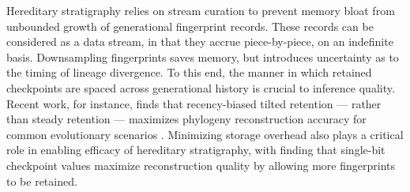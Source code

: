 Hereditary stratigraphy relies on stream curation to prevent memory bloat from unbounded growth of generational fingerprint records.
These records can be considered as a data stream, in that they accrue piece-by-piece, on an indefinite basis.
Downsampling fingerprints saves memory, but introduces uncertainty as to the timing of lineage divergence.
To this end, the manner in which retained checkpoints are spaced across generational history is crucial to inference quality.
Recent work, for instance, finds that recency-biased tilted retention --- rather than steady retention --- maximizes phylogeny reconstruction accuracy for common evolutionary scenarios \citep{moreno2024guide}.
Minimizing storage overhead also plays a critical role in enabling efficacy of hereditary stratigraphy, with \citet{moreno2024guide} finding that single-bit checkpoint values maximize reconstruction quality by allowing more fingerprints to be retained.
